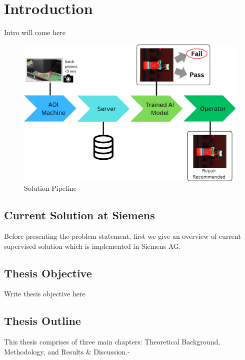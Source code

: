 \section{Introduction}
\label{sec:introduction}

Intro will come here

\begin{figure}[ht!]
    \centering
    \includegraphics[width=1\linewidth]{Images/Solution_Pipeline.png}
    \caption{Solution Pipeline}
    \label{fig:solution pipeline}
\end{figure}

\subsection{Current Solution at Siemens}
\label{subsec:current solution at siemens}

Before presenting the problem statement, first we give an overview of current supervised solution which is implemented in Siemens AG.

\subsection{Thesis Objective}

Write thesis objective here

\subsection{Thesis Outline}
This thesis comprises of three main chapters: Theoretical Background, Methodology, and Results \& Discussion.-